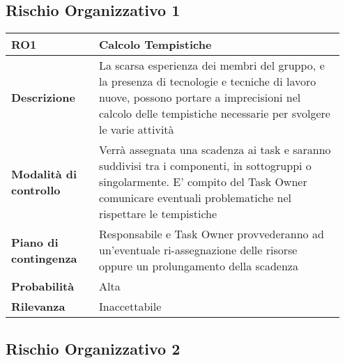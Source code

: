 \subsection{Rischio Organizzativo 1}

\begin{table}[H]
    \bgroup
    \def\arraystretch{1.5}
    \begin{tabular} {
            | p{0.25\linewidth} | p{0.70\linewidth} |
        }
        \hline
        \textbf{RO1}                   & \textbf{Calcolo Tempistiche}                                                                                                                                                                               \\
        \hline
        \textbf{Descrizione}           & La scarsa esperienza dei membri del gruppo, e la presenza di tecnologie e tecniche di lavoro nuove, possono portare a imprecisioni nel calcolo delle tempistiche necessarie per svolgere le varie attività \\
        \hline
        \textbf{Modalità di controllo} & Verrà assegnata una scadenza ai task e saranno suddivisi tra i componenti, in sottogruppi o singolarmente. E’ compito del Task Owner comunicare eventuali problematiche nel rispettare le tempistiche      \\
        \hline
        \textbf{Piano di contingenza}  & Responsabile e Task Owner provvederanno ad un’eventuale ri-assegnazione delle risorse oppure un prolungamento della scadenza                                                                               \\
        \hline
        \textbf{Probabilità}           & Alta                                                                                                                                                                                                       \\
        \hline
        \textbf{Rilevanza}             & Inaccettabile                                                                                                                                                                                              \\
        \hline
    \end{tabular}
    \egroup
\end{table}

\subsection{Rischio Organizzativo 2}

